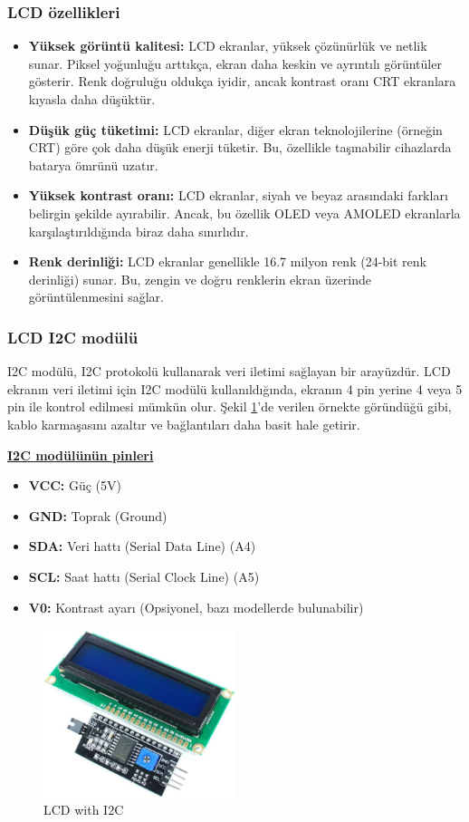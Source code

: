 \subsubsection{LCD özellikleri}
\begin{itemize}   
\item \textbf{Yüksek görüntü kalitesi:} LCD ekranlar, yüksek çözünürlük ve netlik sunar. Piksel yoğunluğu arttıkça, ekran daha keskin ve ayrıntılı görüntüler gösterir. Renk doğruluğu oldukça iyidir, ancak kontrast oranı CRT ekranlara kıyasla daha düşüktür.
\item \textbf{Düşük güç tüketimi:} LCD ekranlar, diğer ekran teknolojilerine (örneğin CRT) göre çok daha düşük enerji tüketir. Bu, özellikle taşınabilir cihazlarda batarya ömrünü uzatır.
\item \textbf{Yüksek kontrast oranı:} LCD ekranlar, siyah ve beyaz arasındaki farkları belirgin şekilde ayırabilir. Ancak, bu özellik OLED veya AMOLED ekranlarla karşılaştırıldığında biraz daha sınırlıdır.
\item \textbf{Renk derinliği:} LCD ekranlar genellikle 16.7 milyon renk (24-bit renk derinliği) sunar. Bu, zengin ve doğru renklerin ekran üzerinde görüntülenmesini sağlar.
\end{itemize}

\subsubsection{LCD I2C modülü}
I2C modülü, I2C protokolü kullanarak veri iletimi sağlayan bir arayüzdür. LCD ekranın veri iletimi için I2C modülü kullanıldığında, ekranın 4 pin yerine 4 veya 5 pin ile kontrol edilmesi mümkün olur. Şekil \ref{fig:15}'de verilen örnekte göründüğü gibi, kablo karmaşasını azaltır ve bağlantıları daha basit hale getirir.
\par\textbf{\underline{I2C modülünün pinleri}}
\begin{itemize}
\item \textbf{VCC:} Güç (5V)
\item \textbf{GND:} Toprak (Ground)
\item \textbf{SDA:} Veri hattı (Serial Data Line) (A4)
\item \textbf{SCL:} Saat hattı (Serial Clock Line) (A5)
\item \textbf{V0:} Kontrast ayarı (Opsiyonel, bazı modellerde bulunabilir)
\end{itemize}

\begin{figure}[H]
\centering
\includegraphics[width=0.50\textwidth]{Resimler/15.png}
\caption{LCD with I2C}
\label{fig:15}
\end{figure}

